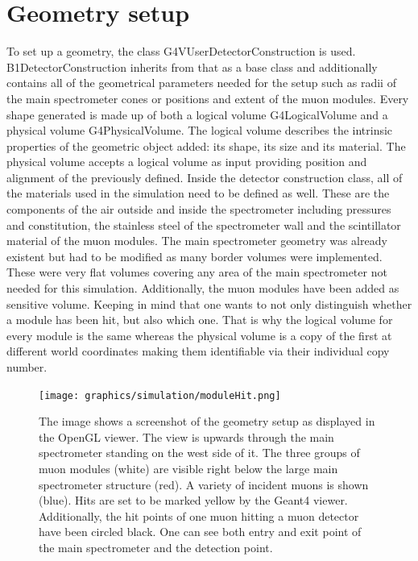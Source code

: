   \section{Geometry setup}
  \label{ch:Simulation software:sec:Geometry setup}
  To set up a geometry, the class G4VUserDetectorConstruction is used. B1DetectorConstruction inherits from that as a base class and additionally contains all of the geometrical parameters needed for the setup such as radii of the main spectrometer cones or positions and extent of the muon modules. Every shape generated is made up of both a logical volume G4LogicalVolume and a physical volume G4PhysicalVolume. The logical volume describes the intrinsic properties of the geometric object added: its shape, its size and its material. The physical volume accepts a logical volume as input providing position and alignment of the previously defined.
  Inside the detector construction class, all of the materials used in the simulation need to be defined as well. These are the components of the air outside and inside the spectrometer including pressures and constitution, the stainless steel of the spectrometer wall and the scintillator material of the muon modules.
  The main spectrometer geometry was already  existent but had to be modified as many border volumes were implemented. These were very flat volumes covering any area of the main spectrometer not needed for this simulation. Additionally, the muon modules have been added as sensitive volume. Keeping in mind that one wants to not only distinguish whether a module has been hit, but also which one. That is why the logical volume for every module is the same whereas the physical volume is a copy of the first at different world coordinates making them identifiable via their individual copy number.
  
  \begin{figure}
  	\centering
  	\texttt{[image: graphics/simulation/moduleHit.png]}
  	\caption[Simulation geometry setup]{The image shows a screenshot of the geometry setup as displayed in the OpenGL viewer. The view is upwards through the main spectrometer standing on the west side of it. The three groups of muon modules (white) are visible right below the large main spectrometer structure (red). A variety of incident muons is shown (blue). Hits are set to be marked yellow by the Geant4 viewer. Additionally, the hit points of one muon hitting a muon detector have been circled black. One can see both entry and exit point of the main spectrometer and the detection point.}
  \end{figure}

